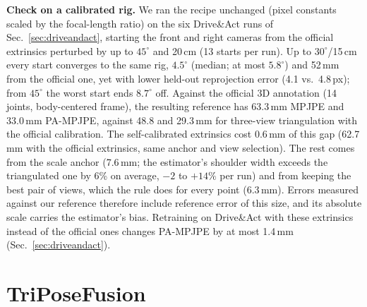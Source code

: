 \documentclass[journal]{IEEEtran}
\newcommand{\da}{Drive\&Act}
\begin{document}
\textbf{Check on a calibrated rig.} We ran the recipe unchanged (pixel constants scaled by the focal-length ratio) on the six \da{} runs of Sec.~\ref{sec:driveandact}, starting the front and right cameras from the official extrinsics perturbed by up to $45^\circ$ and 20\,cm (13 starts per run). Up to $30^\circ$/15\,cm every start converges to the same rig, $4.5^\circ$ (median; at most $5.8^\circ$) and 52\,mm from the official one, yet with lower held-out reprojection error (4.1 vs.\ 4.8\,px); from $45^\circ$ the worst start ends $8.7^\circ$ off. Against the official 3D annotation (14 joints, body-centered frame), the resulting reference has 63.3\,mm MPJPE and 33.0\,mm PA-MPJPE, against 48.8 and 29.3\,mm for three-view triangulation with the official calibration. The self-calibrated extrinsics cost 0.6\,mm of this gap (62.7\,mm with the official extrinsics, same anchor and view selection). The rest comes from the scale anchor (7.6\,mm; the estimator's shoulder width exceeds the triangulated one by 6\% on average, $-2$ to $+14\%$ per run) and from keeping the best pair of views, which the rule does for every point (6.3\,mm). Errors measured against our reference therefore include reference error of this size, and its absolute scale carries the estimator's bias. Retraining on \da{} with these extrinsics instead of the official ones changes PA-MPJPE by at most 1.4\,mm (Sec.~\ref{sec:driveandact}).

\section{TriPoseFusion}
\label{sec:method}
\end{document}
